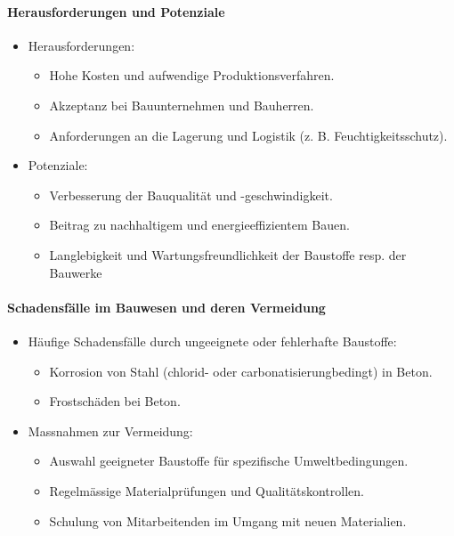 \documentclass[
11pt,
captions=tableheading,
smallheadings,
headsepline,
footsepline, 
parskip=half-,
]{scrartcl}
\begin{document}
\paragraph{Herausforderungen und Potenziale}
\begin{itemize}
    \item Herausforderungen:
          \begin{itemize}
              \item Hohe Kosten und aufwendige Produktionsverfahren.
              \item Akzeptanz bei Bauunternehmen und Bauherren.
              \item Anforderungen an die Lagerung und Logistik (z. B. Feuchtigkeitsschutz).
          \end{itemize}
    \item Potenziale:
          \begin{itemize}
              \item Verbesserung der Bauqualität und -geschwindigkeit.
              \item Beitrag zu nachhaltigem und energieeffizientem Bauen.
              \item Langlebigkeit und Wartungsfreundlichkeit der Baustoffe resp. der Bauwerke
          \end{itemize}
\end{itemize}

\paragraph{Schadensfälle im Bauwesen und deren Vermeidung}
\begin{itemize}
    \item Häufige Schadensfälle durch ungeeignete oder fehlerhafte Baustoffe:
          \begin{itemize}
              \item Korrosion von Stahl  (chlorid- oder carbonatisierungbedingt) in Beton.
              \item Frostschäden bei Beton.
          \end{itemize}
    \item Massnahmen zur Vermeidung:
          \begin{itemize}
              \item Auswahl geeigneter Baustoffe für spezifische Umweltbedingungen.
              \item Regelmässige Materialprüfungen und Qualitätskontrollen.
              \item Schulung von Mitarbeitenden im Umgang mit neuen Materialien.
          \end{itemize}
\end{itemize}
\end{document}

